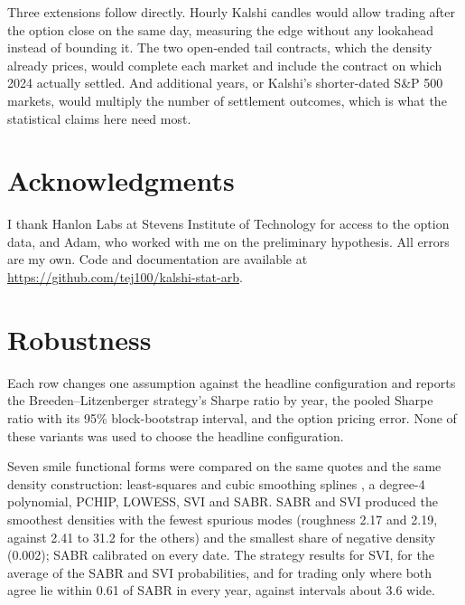 \documentclass{article}
\begin{document}
Three extensions follow directly. Hourly Kalshi candles would allow trading after the option close on the same day, measuring the edge without any lookahead instead of bounding it. The two open-ended tail contracts, which the density already prices, would complete each market and include the contract on which 2024 actually settled. And additional years, or Kalshi's shorter-dated S\&P 500 markets, would multiply the number of settlement outcomes, which is what the statistical claims here need most.

\section*{Acknowledgments}
I thank Hanlon Labs at Stevens Institute of Technology for access to the option data, and Adam, who worked with me on the preliminary hypothesis. All errors are my own. Code and documentation are available at \url{https://github.com/tej100/kalshi-stat-arb}.




\newpage
\appendix
\section{Robustness}\label{app:robust}
Each row changes one assumption against the headline configuration and reports the Breeden--Litzenberger strategy's Sharpe ratio by year, the pooled Sharpe ratio with its 95\% block-bootstrap interval, and the option pricing error. None of these variants was used to choose the headline configuration.

\begin{center}
\small

\label{tab:robust}
\end{center}

Seven smile functional forms were compared on the same quotes and the same density construction: least-squares and cubic smoothing splines \cite{Dierckx1995}, a degree-4 polynomial, PCHIP, LOWESS, SVI \cite{Gatheral2014} and SABR. SABR and SVI produced the smoothest densities with the fewest spurious modes (roughness 2.17 and 2.19, against 2.41 to 31.2 for the others) and the smallest share of negative density (0.002); SABR calibrated on every date. The strategy results for SVI, for the average of the SABR and SVI probabilities, and for trading only where both agree lie within 0.61 of SABR in every year, against intervals about 3.6 wide.
\end{document}

